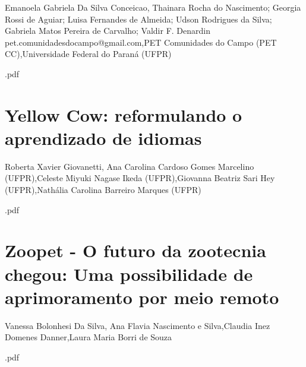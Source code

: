 Emanoela Gabriela Da Silva Conceicao, Thainara Rocha do Nascimento; Georgia Rossi de Aguiar; Luisa Fernandes de Almeida; Udson Rodrigues da Silva; Gabriela Matos Pereira de Carvalho; Valdir F. Denardin  pet.comunidadesdocampo@gmail.com,PET Comunidades do Campo (PET CC),Universidade Federal do Paraná (UFPR)



.pdf\section{Yellow Cow: reformulando o aprendizado de idiomas}

Roberta Xavier Giovanetti, Ana Carolina Cardoso Gomes Marcelino (UFPR),Celeste Miyuki Nagase Ikeda (UFPR),Giovanna Beatriz Sari Hey (UFPR),Nathália Carolina Barreiro Marques (UFPR)



.pdf\section{Zoopet - O futuro da zootecnia chegou: Uma possibilidade de aprimoramento por meio  remoto}

Vanessa Bolonhesi Da Silva, Ana Flavia Nascimento e Silva,Claudia Inez  Domenes Danner,Laura Maria Borri de Souza



.pdf